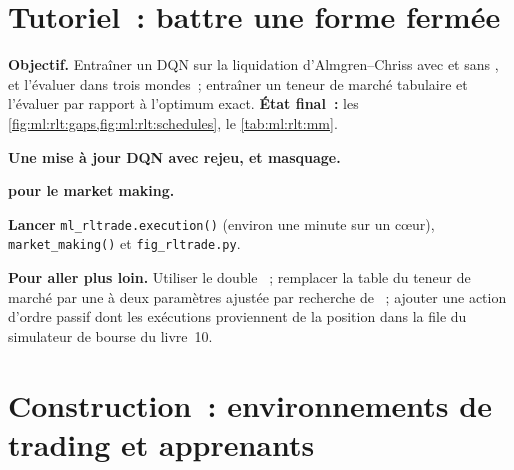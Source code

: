 \section{Tutoriel~: battre une forme fermée}\label{tut:ml:reinforcement-learning-for-execution-and-market-making:tut}

\begin{tutorial}
\textbf{Objectif.} Entraîner un DQN sur la liquidation d'Almgren--Chriss avec et sans , et l'évaluer dans trois
mondes~; entraîner un teneur de marché tabulaire et l'évaluer par rapport à l'optimum exact. \textbf{État final~:}
les \cref{fig:ml:rlt:gaps,fig:ml:rlt:schedules}, le \cref{tab:ml:rlt:mm}.
\begin{tutsteps}
\item \textbf{Une mise à jour DQN avec rejeu,  et masquage.}
\label{lst:ml:rlt:dqn}
\item \textbf{ pour le market making.}
\label{lst:ml:rlt:mm}
\item \textbf{Lancer} \texttt{ml\_rltrade.execution()} (environ une minute sur un cœur), \texttt{market\_making()} et
\texttt{fig\_rltrade.py}.
\end{tutsteps}
\textbf{Pour aller plus loin.} Utiliser le double ~; remplacer la table du teneur de marché par une  à deux paramètres ajustée par
recherche de ~; ajouter une action d'ordre passif dont les exécutions proviennent de la position dans la file du simulateur de bourse du livre~10.
\end{tutorial}

\section{Construction~: environnements de trading et apprenants}\label{bld:ml:reinforcement-learning-for-execution-and-market-making:rltrade}

